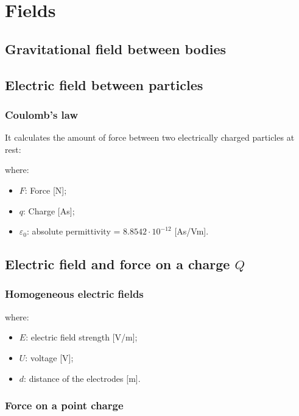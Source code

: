 \documentclass{article}
\begin{document}
\newpage
\section{Fields}
\subsection{Gravitational field between bodies}

\subsection{Electric field between particles}
\subsubsection{Coulomb's law}
It calculates the amount of force between two electrically charged
particles at rest:

where:
\begin{itemize}
    \item $F$: Force [N];
    \item $q$: Charge [As];
    \item $\varepsilon_0$: absolute permittivity = $8.8542\cdot 10^{-12}$ [As/Vm].
\end{itemize}

\subsection{Electric field and force on a charge $Q$}
\subsubsection{Homogeneous electric fields}

where:
\begin{itemize}
    \item $E$: electric field strength [V/m];
    \item $U$: voltage [V];
    \item $d$: distance of the electrodes [m].
\end{itemize}

\subsubsection{Force on a point charge}
\end{document}
